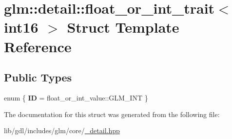 \hypertarget{structglm_1_1detail_1_1float__or__int__trait_3_01int16_01_4}{}\section{glm\+:\+:detail\+:\+:float\+\_\+or\+\_\+int\+\_\+trait$<$ int16 $>$ Struct Template Reference}
\label{structglm_1_1detail_1_1float__or__int__trait_3_01int16_01_4}
\subsection*{Public Types}
\begin{DoxyCompactItemize}
\item 
\hypertarget{structglm_1_1detail_1_1float__or__int__trait_3_01int16_01_4_a45e8fcbba7cca6a99c1c548f3a60caf9}{}enum \{ {\bfseries I\+D} = float\+\_\+or\+\_\+int\+\_\+value\+:\+:G\+L\+M\+\_\+\+I\+N\+T
 \}\label{structglm_1_1detail_1_1float__or__int__trait_3_01int16_01_4_a45e8fcbba7cca6a99c1c548f3a60caf9}

\end{DoxyCompactItemize}


The documentation for this struct was generated from the following file\+:\begin{DoxyCompactItemize}
\item 
lib/gdl/includes/glm/core/\hyperlink{__detail_8hpp}{\+\_\+detail.\+hpp}\end{DoxyCompactItemize}

